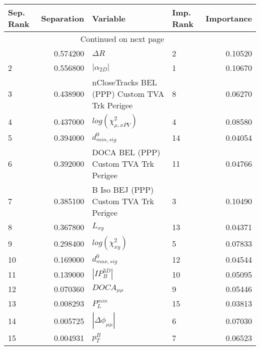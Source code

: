 \usepackage{lscape}

\begin{landscape}
\begin{longtable}{lrllr}
\toprule
Sep. Rank &  Separation &                                       Variable & Imp. Rank &  Importance \\
\midrule
\endhead
\midrule
\multicolumn{3}{r}{{Continued on next page}} \\
\midrule
\endfoot

\bottomrule
\endlastfoot
        1 &    0.574200 &                                     $\Delta R$ &         2 &     0.10520 \\
        2 &    0.556800 &                                $|\alpha_{2D}|$ &         1 &     0.10670 \\
        3 &    0.438900 &  nCloseTracks BEL (PPP) Custom TVA Trk Perigee &         8 &     0.06270 \\
        4 &    0.437000 &                      $log(\chi^{2}_{\mu,xPV})$ &         4 &     0.08580 \\
        5 &    0.394000 &                               $d^0_{min, sig}$ &        14 &     0.04054 \\
        6 &    0.392000 &          DOCA BEL (PPP) Custom TVA Trk Perigee &        11 &     0.04766 \\
        7 &    0.385100 &         B Iso BEJ (PPP) Custom TVA Trk Perigee &         3 &     0.10490 \\
        8 &    0.367800 &                                       $L_{xy}$ &        13 &     0.04371 \\
        9 &    0.298400 &                           $log(\chi^{2}_{xy})$ &         5 &     0.07833 \\
       10 &    0.169000 &                               $d^0_{max, sig}$ &        12 &     0.04544 \\
       11 &    0.139000 &                                $|IP_{B}^{3D}|$ &        10 &     0.05095 \\
       12 &    0.070360 &                                $DOCA_{\mu\mu}$ &         9 &     0.05446 \\
       13 &    0.008293 &                                  $P^{min}_{L}$ &        15 &     0.03813 \\
       14 &    0.005725 &                       $|\Delta \phi_{\mu\mu}|$ &         6 &     0.07030 \\
       15 &    0.004931 &                                      $p^B_{T}$ &         7 &     0.06523 \\
\end{longtable}

\end{landscape}

